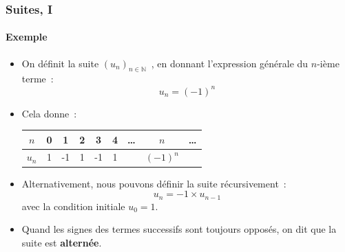 \documentclass[10pt,notheorems]{beamer}
\theoremstyle{plain}
\theoremstyle{definition} %
\begin{document}
\begin{frame}
  \frametitle{Suites, I}
  \framesubtitle{Exemple}
  \hypertarget{slide_suites_2}{}

  \begin{itemize}

  \item On définit la suite $(u_n)_{n\in\mathbb N}$~, en donnant l'expression générale du $n$-ième terme~:
    \[
      u_n = (-1)^n
    \]

  \item Cela donne~:\newline
    \begin{center}
      \begin{table}[H]
        \centering
        \begin{tabular}{c|cccccccc}
          $n$ & 0 & 1 & 2 & 3 & 4 & \ldots & $n$ & \ldots\\\hline
          $u_n$ & 1 & -1 & 1 & -1 & 1 &     & $(-1)^n$ &
        \end{tabular}
      \end{table}
    \end{center}

    \bigskip

  \item Alternativement, nous pouvons définir la suite récursivement~:
    \[
      u_n = -1\times u_{n-1}
    \]
    avec la condition initiale $u_0 = 1$.\newline

  \item Quand les signes des termes successifs sont toujours opposés, on dit que la suite est \textbf{alternée}.
  \end{itemize}

\end{frame}
\end{document}
